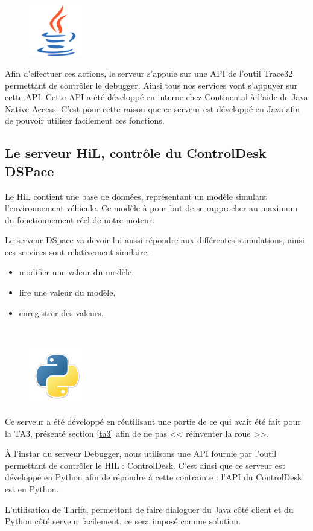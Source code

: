 \begin{figure}
	\vspace{-40px}
	\includegraphics[width=2.5cm]{contents/images/logoJava.png}
\end{figure}
Afin d'effectuer ces actions, le serveur s'appuie sur une API de l'outil Trace32 permettant de contrôler le debugger. Ainsi tous nos services vont s'appuyer sur cette API. Cette API a été développé en interne chez Continental à l'aide de Java Native Access. C'est pour cette raison que ce serveur est développé en Java afin de pouvoir utiliser
facilement ces fonctions.

\subsection{Le serveur HiL, contrôle du ControlDesk DSPace}
\vspace{-10px}
Le HiL contient une base de données, représentant un modèle simulant l'environnement véhicule. Ce modèle à pour but de se rapprocher au maximum du fonctionnement réel de notre moteur.

Le serveur DSpace va devoir lui aussi répondre aux différentes stimulations, ainsi ces services sont relativement similaire : 
\begin{itemize}
	\item modifier une valeur du modèle,
	\item lire une valeur du modèle,
	\item enregistrer des valeurs.
\end{itemize}~

\begin{figure}
	\includegraphics[width=2.5cm]{contents/images/python.png}
\end{figure}
Ce serveur a été développé en réutilisant une partie de ce qui avait été fait pour la TA3, présenté section \ref{ta3} afin de ne pas
<< réinventer la roue >>. 

À l'instar du serveur Debugger, nous utilisons une API fournie par l'outil permettant de contrôler le HIL : ControlDesk. 
C'est ainsi que ce serveur est développé en Python afin de répondre à cette contrainte : l'API du ControlDesk est en Python. 

L'utilisation de Thrift, permettant de faire dialoguer du Java côté client et du Python côté serveur facilement, ce sera imposé comme solution.


